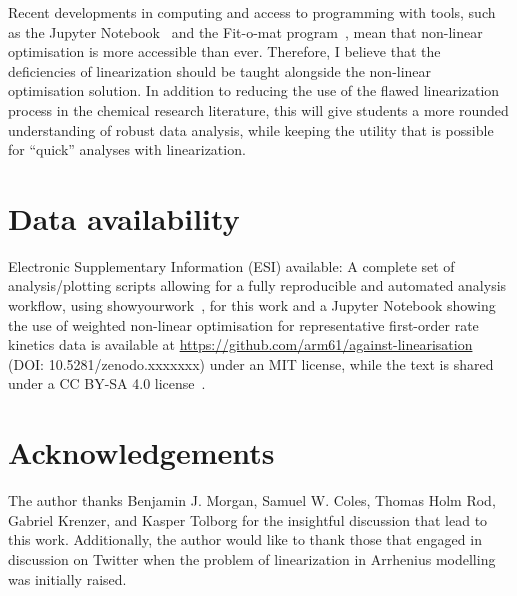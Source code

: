 \documentclass[journal=jceda8,manuscript=article]{achemso}
\begin{document}
Recent developments in computing and access to programming with tools, such as the Jupyter Notebook~\cite{kluyver_jupyter_2016} and the Fit-o-mat program~\cite{mglich_open_2018}, mean that non-linear optimisation is more accessible than ever. 
Therefore, I believe that the deficiencies of linearization should be taught alongside the non-linear optimisation solution. 
In addition to reducing the use of the flawed linearization process in the chemical research literature, this will give students a more rounded understanding of robust data analysis, while keeping the utility that is possible for ``quick'' analyses with linearization.

\section*{Data availability}

Electronic Supplementary Information (ESI) available: A complete set of analysis/plotting scripts allowing for a fully reproducible and automated analysis workflow, using showyourwork~\cite{luger_showyourwork_2021}, for this work and a Jupyter Notebook showing the use of weighted non-linear optimisation for representative first-order rate kinetics data is available at \url{https://github.com/arm61/against-linearisation} (DOI: 10.5281/zenodo.xxxxxxx) under an MIT license, while the text is shared under a CC BY-SA 4.0 license~\cite{mccluskey_github_2023}.

\section*{Acknowledgements}

The author thanks Benjamin J. Morgan, Samuel W. Coles, Thomas Holm Rod, Gabriel Krenzer, and Kasper Tolborg for the insightful discussion that lead to this work. 
Additionally, the author would like to thank those that engaged in discussion on Twitter when the problem of linearization in Arrhenius modelling was initially raised. 


\end{document}
